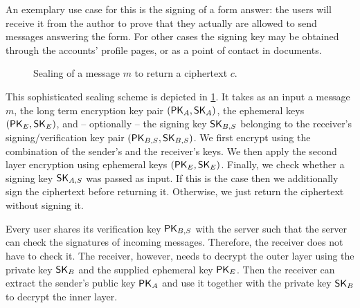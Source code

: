 An exemplary use case for this is the signing of a form answer: the users will receive it from the author to prove that they actually are allowed to send messages answering the form.
For other cases the signing key may be obtained through the accounts' profile pages, or as a point of contact in documents.

\begin{figure}[t!]
  \centering
  
  \caption{Sealing of a message $m$ to return a ciphertext $c$.}
  \label{fig:sealing}
\end{figure}

This sophisticated sealing scheme is depicted in \cref{fig:sealing}.
It takes as an input a message $m$, the long term encryption key pair $\myKeyPair{_A}$, the ephemeral keys $\myKeyPair{_E}$, and -- optionally -- the signing key $\mySK_{B,S}$ belonging to the receiver's signing/verification key pair $\myKeyPair{_{B,S}}$.
We first encrypt using the combination of the sender's and the receiver's keys.
We then apply the second layer encryption using ephemeral keys $\myKeyPair{_E}$.
Finally, we check whether a signing key $\mySK_{A,S}$ was passed as input.
If this is the case then we additionally sign the ciphertext before returning it.
Otherwise, we just return the ciphertext without signing it.

Every user shares its verification key $\myPK_{B,S}$ with the server such that the server can check the signatures of incoming messages.
Therefore, the receiver does not have to check it.
The receiver, however, needs to decrypt the outer layer using the private key $\mySK_B$ and the supplied ephemeral key $\myPK_E$.
Then the receiver can extract the sender's public key $\myPK_A$ and use it together with the private key $\mySK_B$ to decrypt the inner layer.

